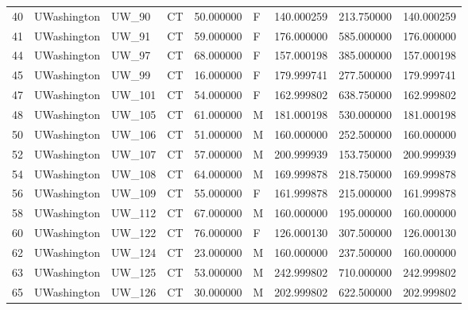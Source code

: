 \begin{tabular}{llllrlrrr}
40     &     UWashington &        UW\_90 &                 CT &  50.000000 &        F &       140.000259 &    213.750000 &  140.000259 \\
41     &     UWashington &        UW\_91 &                 CT &  59.000000 &        F &       176.000000 &    585.000000 &  176.000000 \\
44     &     UWashington &        UW\_97 &                 CT &  68.000000 &        F &       157.000198 &    385.000000 &  157.000198 \\
45     &     UWashington &        UW\_99 &                 CT &  16.000000 &        F &       179.999741 &    277.500000 &  179.999741 \\
47     &     UWashington &       UW\_101 &                 CT &  54.000000 &        F &       162.999802 &    638.750000 &  162.999802 \\
48     &     UWashington &       UW\_105 &                 CT &  61.000000 &        M &       181.000198 &    530.000000 &  181.000198 \\
50     &     UWashington &       UW\_106 &                 CT &  51.000000 &        M &       160.000000 &    252.500000 &  160.000000 \\
52     &     UWashington &       UW\_107 &                 CT &  57.000000 &        M &       200.999939 &    153.750000 &  200.999939 \\
54     &     UWashington &       UW\_108 &                 CT &  64.000000 &        M &       169.999878 &    218.750000 &  169.999878 \\
56     &     UWashington &       UW\_109 &                 CT &  55.000000 &        F &       161.999878 &    215.000000 &  161.999878 \\
58     &     UWashington &       UW\_112 &                 CT &  67.000000 &        M &       160.000000 &    195.000000 &  160.000000 \\
60     &     UWashington &       UW\_122 &                 CT &  76.000000 &        F &       126.000130 &    307.500000 &  126.000130 \\
62     &     UWashington &       UW\_124 &                 CT &  23.000000 &        M &       160.000000 &    237.500000 &  160.000000 \\
63     &     UWashington &       UW\_125 &                 CT &  53.000000 &        M &       242.999802 &    710.000000 &  242.999802 \\
65     &     UWashington &       UW\_126 &                 CT &  30.000000 &        M &       202.999802 &    622.500000 &  202.999802 \\

\end{tabular}
